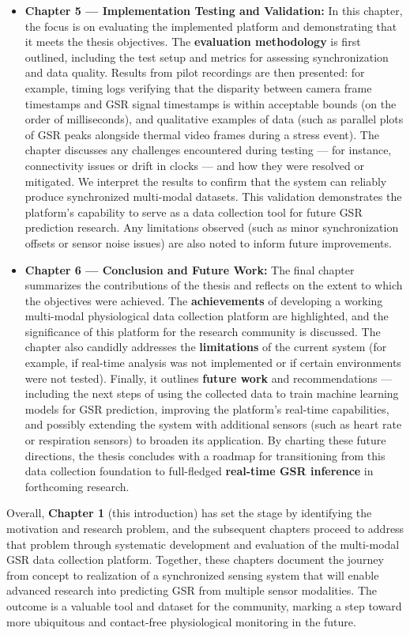 \begin{itemize}
\item \textbf{Chapter 5 --- Implementation Testing and Validation:} In this
  chapter, the focus is on evaluating the implemented platform and
  demonstrating that it meets the thesis objectives. The \textbf{evaluation
  methodology} is first outlined, including the test setup and metrics
  for assessing synchronization and data quality. Results from pilot
  recordings are then presented: for example, timing logs verifying that
  the disparity between camera frame timestamps and GSR signal
  timestamps is within acceptable bounds (on the order of milliseconds),
  and qualitative examples of data (such as parallel plots of GSR peaks
  alongside thermal video frames during a stress event). The chapter
  discusses any challenges encountered during testing --- for instance,
  connectivity issues or drift in clocks --- and how they were resolved
  or mitigated. We interpret the results to confirm that the system can
  reliably produce synchronized multi-modal datasets. This validation
  demonstrates the platform's capability to serve as a data collection
  tool for future GSR prediction research. Any limitations observed
  (such as minor synchronization offsets or sensor noise issues) are
  also noted to inform future improvements.

\item \textbf{Chapter 6 --- Conclusion and Future Work:} The final chapter
  summarizes the contributions of the thesis and reflects on the extent
  to which the objectives were achieved. The \textbf{achievements} of
  developing a working multi-modal physiological data collection
  platform are highlighted, and the significance of this platform for
  the research community is discussed. The chapter also candidly
  addresses the \textbf{limitations} of the current system (for example, if
  real-time analysis was not implemented or if certain environments were
  not tested). Finally, it outlines \textbf{future work} and recommendations
  --- including the next steps of using the collected data to train
  machine learning models for GSR prediction, improving the platform's
  real-time capabilities, and possibly extending the system with
  additional sensors (such as heart rate or respiration sensors) to
  broaden its application. By charting these future directions, the
  thesis concludes with a roadmap for transitioning from this data
  collection foundation to full-fledged \textbf{real-time GSR inference} in
  forthcoming research.

\end{itemize}
Overall, \textbf{Chapter 1} (this introduction) has set the stage by
identifying the motivation and research problem, and the subsequent
chapters proceed to address that problem through systematic development
and evaluation of the multi-modal GSR data collection platform.
Together, these chapters document the journey from concept to
realization of a synchronized sensing system that will enable advanced
research into predicting GSR from multiple sensor modalities. The
outcome is a valuable tool and dataset for the community, marking a step
toward more ubiquitous and contact-free physiological monitoring in the
future.
